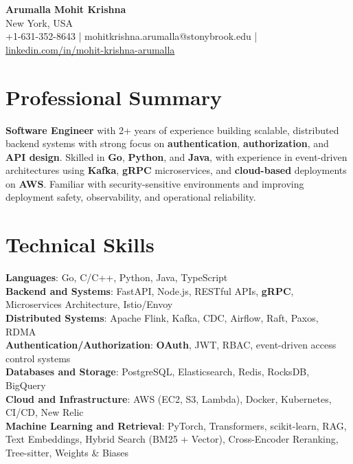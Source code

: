 \documentclass[letterpaper,11pt]{article}
\begin{document}
\begin{center}
  {\Large \textbf{Arumalla Mohit Krishna}} \\
  New York, USA \\
  +1-631-352-8643 \enspace | \enspace mohitkrishna.arumalla@stonybrook.edu \enspace | \enspace \href{https://www.linkedin.com/in/mohit-krishna-arumalla}{linkedin.com/in/mohit-krishna-arumalla}
\end{center}

\section{Professional Summary}
  \begin{itemize}[leftmargin=0.15in, label={}]
    \small{\item{
     \textbf{Software Engineer} with 2+ years of experience building scalable, distributed backend systems with strong focus on \textbf{authentication}, \textbf{authorization}, and \textbf{API design}. Skilled in \textbf{Go}, \textbf{Python}, and \textbf{Java}, with experience in event-driven architectures using \textbf{Kafka}, \textbf{gRPC} microservices, and \textbf{cloud-based} deployments on \textbf{AWS}. Familiar with security-sensitive environments and improving deployment safety, observability, and operational reliability.
    }}
  \end{itemize}
\vspace{-16pt}

\section{Technical Skills}
 \begin{itemize}[leftmargin=0.15in, label={}]
    \small{\item{
     \textbf{Languages}: Go, C/C++, Python, Java, TypeScript \\
     \textbf{Backend and Systems}: FastAPI, Node.js, RESTful APIs, \textbf{gRPC}, Microservices Architecture, Istio/Envoy \\
     \textbf{Distributed Systems}: Apache Flink, Kafka, CDC, Airflow, Raft, Paxos, RDMA \\
     \textbf{Authentication/Authorization}: \textbf{OAuth}, JWT, RBAC, event-driven access control systems \\
     \textbf{Databases and Storage}: PostgreSQL, Elasticsearch, Redis, RocksDB, BigQuery \\
     \textbf{Cloud and Infrastructure}: AWS (EC2, S3, Lambda), Docker, Kubernetes, CI/CD, New Relic \\
     \textbf{Machine Learning and Retrieval}: PyTorch, Transformers, scikit-learn, RAG, Text Embeddings, Hybrid Search (BM25 + Vector), Cross-Encoder Reranking, Tree-sitter, Weights \& Biases
    }}
 \end{itemize}
\vspace{-16pt}
\end{document}
